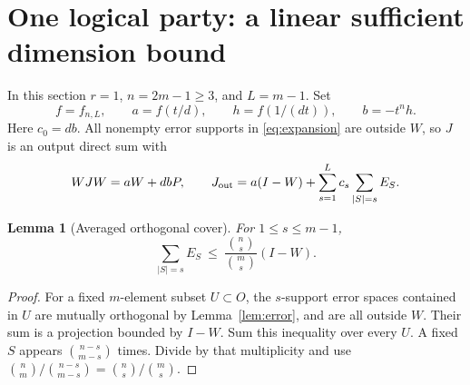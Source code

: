 \documentclass[11pt,a4paper]{article}
\newtheorem{lemma}[theorem]{Lemma}
\begin{document}
\section{One logical party: a linear sufficient dimension bound}
In this section \(r=1\), \(n=2m-1\ge3\), and \(L=m-1\). Set
\[
 f=f_{n,L},\qquad a=f(t/d),\qquad h=f(1/(dt)),\qquad b=-t^n h.
\]
Here \(c_0=db\). All nonempty error supports in \eqref{eq:expansion} are outside \(W\), so \(J\) is an output direct sum with
\begin{equation}\label{eq:codeblock}
 WJW=aW+dbP,\qquad
 J_{\rm out}=a(I-W)+\sum_{s=1}^Lc_s\sum_{|S|=s}E_S.
\end{equation}

\begin{lemma}[Averaged orthogonal cover]\label{lem:cover}
For \(1\le s\le m-1\),
\begin{equation}\label{eq:cover}
 \sum_{|S|=s}E_S\ \le\
 \frac{\binom ns}{\binom ms}(I-W).
\end{equation}
\end{lemma}
\begin{proof}
For a fixed \(m\)-element subset \(U\subset O\), the \(s\)-support error spaces contained in \(U\) are mutually orthogonal by Lemma~\ref{lem:error}, and are all outside \(W\). Their sum is a projection bounded by \(I-W\). Sum this inequality over every \(U\). A fixed \(S\) appears \(\binom{n-s}{m-s}\) times. Divide by that multiplicity and use
\(\binom nm/\binom{n-s}{m-s}=\binom ns/\binom ms\).
\end{proof}
\end{document}
